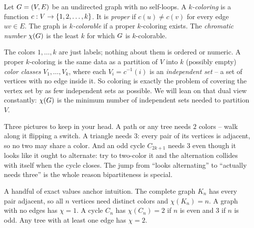 \begin{definition}
\label{ch28:def-coloring}
Let $G=(V,E)$ be an undirected graph with no self-loops. A \emph{$k$-coloring}
is a function $c:V\to\{1,2,\dots,k\}$. It is \emph{proper} if $c(u)\neq c(v)$ for
every edge $uv\in E$. The graph is \emph{$k$-colorable} if a proper $k$-coloring
exists. The \emph{chromatic number} $\chi(G)$ is the least $k$ for which $G$
is $k$-colorable.
\end{definition}

The colors $1,\dots,k$ are just labels; nothing about them is ordered or numeric.
A proper $k$-coloring is the same data as a partition of $V$ into $k$ (possibly
empty) \emph{color classes} $V_1,\dots,V_k$, where each $V_i=c^{-1}(i)$ is an
\emph{independent set} -- a set of vertices with no edge inside it. So coloring is
exactly the problem of covering the vertex set by as few independent sets as
possible. We will lean on that dual view constantly: $\chi(G)$ is the minimum
number of independent sets needed to partition $V$.

\begin{intuitionbox}
Three pictures to keep in your head. A path or any tree needs $2$ colors -- walk
along it flipping a switch. A triangle needs $3$: every pair of its vertices is
adjacent, so no two may share a color. And an odd cycle $C_{2k+1}$ needs $3$ even
though it looks like it ought to alternate: try to two-color it and the alternation
collides with itself when the cycle closes. The jump from ``looks alternating'' to
``actually needs three'' is the whole reason bipartiteness is special.
\end{intuitionbox}

A handful of exact values anchor intuition. The complete graph $K_n$ has every
pair adjacent, so all $n$ vertices need distinct colors and $\chi(K_n)=n$. A graph
with no edges has $\chi=1$. A cycle $C_n$ has $\chi(C_n)=2$ if $n$ is even and $3$
if $n$ is odd. Any tree with at least one edge has $\chi=2$.

